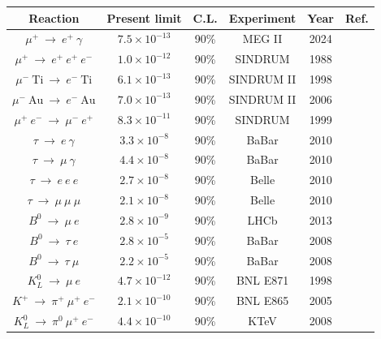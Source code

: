 \begin{center}  
\begin{table}[!h]
\centering
\renewcommand{\arraystretch}{1.5}
\begin{tabular}{c c c c c c}
\hline
Reaction & Present limit & C.L. & Experiment &  Year & Ref.\\
\hline
$\mu^+\ \rightarrow \ e^+ \ \gamma$& $7.5 \times 10^{-13}$ & 90\% & MEG II & 2024 & \cite{megiicollaboration2024search}\\
$\mu^+ \ \rightarrow \ e^+ \ e^+ \ e^-$ & $1.0 \times 10^{-12}$ & 90\% & SINDRUM & 1988 & \cite{SINDRUM:1987nra} \\
$\mu^- \ \text{Ti}\ \rightarrow \ e^- \ \text{Ti}$ &  $6.1 \times 10^{-13}$ & 90\% & SINDRUM II & 1998 & \cite{titanium}\\
$\mu^- \ \text{Au}\ \rightarrow \ e^- \ \text{Au}$ & $7.0 \times 10^{-13}$ & 90\% & SINDRUM II & 2006 & \cite{SINDRUMII:2006dvw} \\
$\mu^+ \ e^- \ \rightarrow \ \mu^- \ e^+$ & $8.3 \times 10^{-11}$ & 90\% & SINDRUM & 1999 & \cite{Willmann:1998gd}\\
$\tau \ \rightarrow \ e \ \gamma$ & $3.3 \times 10^{-8}$ & 90\% & BaBar & 2010 & \cite{Aubert_2010}\\
$\tau \ \rightarrow \ \mu \ \gamma$ & $4.4 \times 10^{-8}$ & 90\% & BaBar & 2010 & \cite{Aubert_2010}\\
$\tau \ \rightarrow \ e \ e \  e$ & $2.7 \times 10^{-8}$ & 90\% & Belle & 2010 & \cite{Hayasaka_2010}\\
$\tau \ \rightarrow \ \mu \ \mu  \ \mu$ & $2.1 \times 10^{-8}$ & 90\% & Belle & 2010 & \cite{Hayasaka_2010} \\
\hline
$B^0 \ \rightarrow \ \mu \ e$ & $2.8 \times 10^{-9}$ & 90\% & LHCb & 2013 & \cite{PhysRevLett.111.141801}\\
$B^0 \ \rightarrow \ \tau \ e$ & $2.8 \times 10^{-5}$ & 90\% & BaBar & 2008 & \cite{PhysRevD.77.091104}\\
$B^0 \ \rightarrow \ \tau \ \mu$ & $2.2 \times 10^{-5}$ & 90\% & BaBar & 2008 & \cite{PhysRevD.77.091104}\\
$K_L^0 \ \rightarrow \ \mu \ e$ & $4.7 \times 10^{-12}$& 90\% & BNL E871 & 1998 & \cite{BNL:1998apv}\\
$K^+\ \rightarrow \ \pi^+ \ \mu^+ \ e^-$ & $2.1 \times 10^{-10} $ & 90\% & BNL E865 & 2005 & \cite{PhysRevD.72.012005}\\
$K_L^0 \ \rightarrow \ \pi^0 \ \mu^+ \ e^-$ & $ 4.4 \times 10^{-10}$ & 90\% & KTeV & 2008 & \cite{KTeV:2007cvy}\\

\end{tabular}
\end{table}
\end{center}

